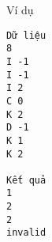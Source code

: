 Ví dụ
\begin{verbatim}
Dữ liệu
8
I -1
I -1
I 2
C 0
K 2
D -1
K 1
K 2

Kết quả
1
2
2
invalid
\end{verbatim}